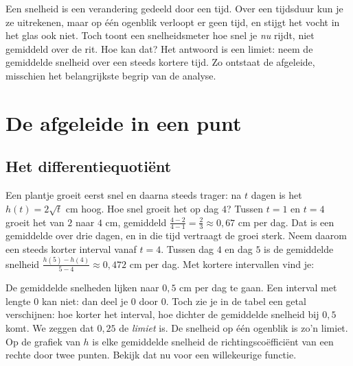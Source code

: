 Een snelheid is een verandering gedeeld door een tijd. Over een tijdsduur kun je ze uitrekenen, maar op één ogenblik verloopt er geen tijd, en stijgt het vocht in het glas ook niet. Toch toont een snelheidsmeter hoe snel je \textit{nu} rijdt, niet gemiddeld over de rit. Hoe kan dat? Het antwoord is een limiet: neem de gemiddelde snelheid over een steeds kortere tijd. Zo ontstaat de afgeleide, misschien het belangrijkste begrip van de analyse. 

\begin{oefeningen}[Start]

\end{oefeningen}

\section{De afgeleide in een punt}

\subsection{Het differentiequotiënt}

Een plantje groeit eerst snel en daarna steeds trager: na $t$ dagen is het $h(t) = 2\sqrt{t}$ cm hoog. Hoe snel groeit het op dag $4$? Tussen $t = 1$ en $t = 4$ groeit het van $2$ naar $4$ cm, gemiddeld $\frac{4 - 2}{4 - 1} = \frac23 \approx 0{,}67$ cm per dag. Dat is een gemiddelde over drie dagen, en in die tijd vertraagt de groei sterk. Neem daarom een steeds korter interval vanaf $t = 4$. Tussen dag $4$ en dag $5$ is de gemiddelde snelheid $\frac{h(5) - h(4)}{5 - 4} \approx 0{,}472$ cm per dag. Met kortere intervallen vind je:


De gemiddelde snelheden lijken naar $0{,}5$ cm per dag te gaan. Een interval met lengte $0$ kan niet: dan deel je $0$ door $0$. Toch zie je in de tabel een getal verschijnen: hoe korter het interval, hoe dichter de gemiddelde snelheid bij $0{,}5$ komt. We zeggen dat $0{,}25$ de \textit{limiet} is. De snelheid op één ogenblik is zo'n limiet. Op de grafiek van $h$ is elke gemiddelde snelheid de richtingscoëfficiënt van een rechte door twee punten. Bekijk dat nu voor een willekeurige functie.

